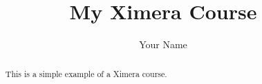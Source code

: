 \documentclass{ximera}
\title{My Ximera Course}
\author{Your Name}
\begin{document}
\begin{abstract}
    This is a simple example of a Ximera course.
\end{abstract}

\maketitle

\end{document}
